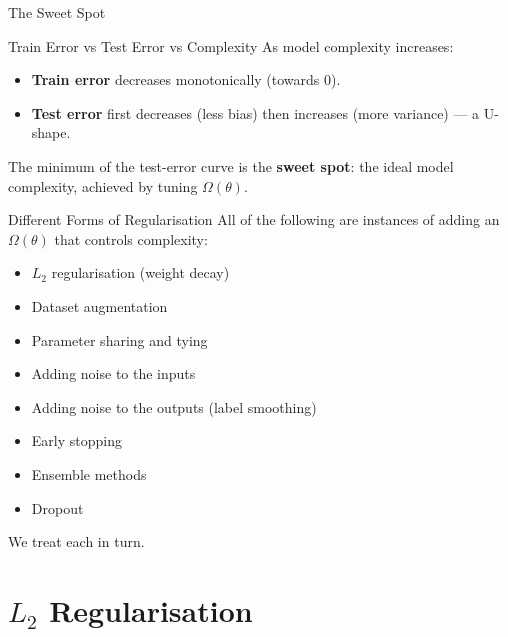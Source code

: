 \documentclass{beamer}
\begin{document}
\begin{frame}[shrink=10]{The Sweet Spot}
  \begin{block}{Train Error vs Test Error vs Complexity}
    As model complexity increases:
    \begin{itemize}\setlength\itemsep{3pt}
      \item \textbf{Train error} decreases monotonically (towards $0$).
      \item \textbf{Test error} first decreases (less bias) then increases
            (more variance) --- a U-shape.
    \end{itemize}
    The minimum of the test-error curve is the \textbf{sweet spot}: the
    ideal model complexity, achieved by tuning $\Omega(\theta)$.
  \end{block}

  \begin{exampleblock}{Different Forms of Regularisation}
    All of the following are instances of adding an $\Omega(\theta)$ that
    controls complexity:
    \begin{itemize}\setlength\itemsep{1pt}
      \item $L_2$ regularisation (weight decay)
      \item Dataset augmentation
      \item Parameter sharing and tying
      \item Adding noise to the inputs
      \item Adding noise to the outputs (label smoothing)
      \item Early stopping
      \item Ensemble methods
      \item Dropout
    \end{itemize}
    We treat each in turn.
  \end{exampleblock}
\end{frame}

\section{$L_2$ Regularisation}
\end{document}
